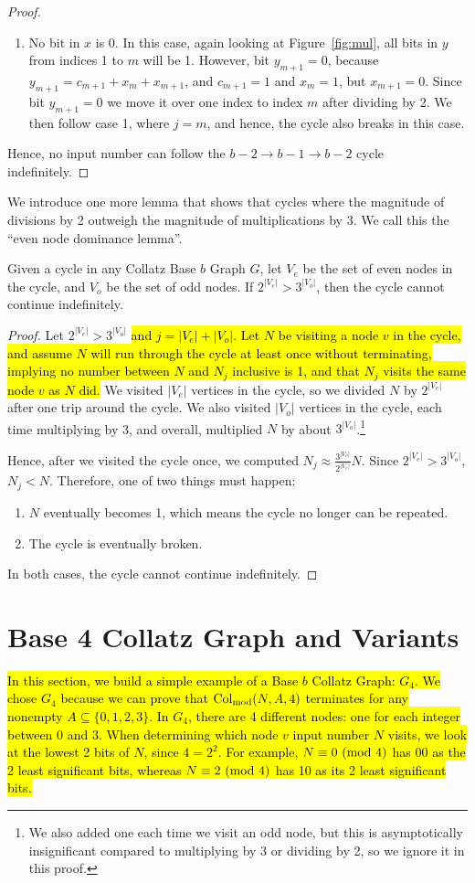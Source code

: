 \begin{proof}
\begin{enumerate}
    \item No bit in $x$ is 0. In this case, again looking at Figure~\ref{fig:mul}, all bits in $y$ from indices 1 to $m$ will be 1. However, bit $y_{m+1} = 0$, because $y_{m+1} = c_{m+1} + x_{m} + x_{m+1}$, and $c_{m+1} = 1$ and $x_{m} = 1$, but $x_{m+1} = 0$. Since bit $y_{m+1} = 0$ we move it over one index to index $m$ after dividing by 2. We then follow case 1, where $j = m$, and hence, the cycle also breaks in this case.
 \end{enumerate}
 Hence, no input number can follow the $b-2 \rightarrow b-1 \rightarrow b-2$ cycle indefinitely. 
\end{proof}
We introduce one more lemma that shows that cycles where the magnitude of divisions by 2 outweigh the magnitude of multiplications by 3. We call this the ``even node dominance lemma''.
\begin{lemma}
\label{lem:EvenDom}
Given a cycle in any Collatz Base $b$ Graph $G$, let $V_{e}$ be the set of even nodes in the cycle, and $V_{o}$ be the set of odd nodes. If $2^{|V_e|} > 3^{|V_o|}$, then the cycle cannot continue indefinitely.
\end{lemma}
\begin{proof}
Let $2^{|V_e|} > 3^{|V_o|}$ \hl{and $j=|V_e| + |V_o|$. Let $N$ be visiting a node $v$ in the cycle, and assume $N$ will run through the cycle at least once without terminating, implying no number between $N$ and $N_j$ inclusive is 1, and that $N_j$ visits the same node $v$ as $N$ did.} We visited $|V_e|$ vertices in the cycle, so we divided $N$ by $2^{|V_e|}$ after one trip around the cycle. We also visited $|V_o|$ vertices in the cycle, each time multiplying by 3, and overall, multiplied $N$ by about $3^{|V_o|}$.\footnote{We also added one each time we visit an odd node, but this is asymptotically insignificant compared to multiplying by 3 or dividing by 2, so we ignore it in this proof.}\par
Hence, after we visited the cycle once, we computed $N_{j} \approx \frac{3^{|V_o|}}{2^{|V_e|}}N$. Since $2^{|V_e|} > 3^{|V_o|}$, $N_{j} < N$. Therefore, one of two things must happen:
\begin{enumerate}
\item $N$ eventually becomes 1, which means the cycle no longer can be repeated.
\item The cycle is eventually broken.
\end{enumerate}
In both cases, the cycle cannot continue indefinitely.
\end{proof}
\section{Base 4 Collatz Graph and Variants} \label{subsec:base4graph}
\hl{In this section, we build a simple example of a Base $b$ Collatz Graph:  $G_4$. We chose $G_4$ because we can prove that $\mathrm{Col}_{\text{mod}}(N,A,4)$ terminates for any nonempty $A \subseteq \{0,1,2,3\}$. In $G_4$, there are 4 different nodes: one for each integer between 0 and 3. When determining which node $v$ input number $N$ visits, we look at the lowest 2 bits of $N$, since $4= 2^2$. For example, $N \equiv 0\ (\mathrm{mod}\ 4)$ has 00 as the 2 least significant bits, whereas $N \equiv 2\ (\mathrm{mod}\ 4)$ has 10 as its 2 least significant bits.}
